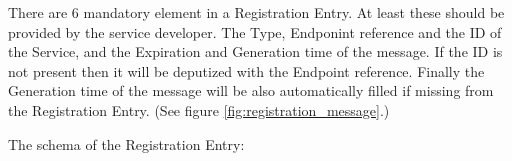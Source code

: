 There are 6 mandatory element in a Registration Entry. At least these should be provided by the service developer. The Type, Endponint reference and the ID of the Service, and the Expiration and Generation time of the message. If the ID is not present then it will be deputized with the Endpoint reference. Finally the Generation time of the message will be also automatically filled if missing from the Registration Entry. (See figure \ref{fig:registration_message}.)
\begin{figure}[ht]
\end{figure}
The schema of the Registration Entry:
